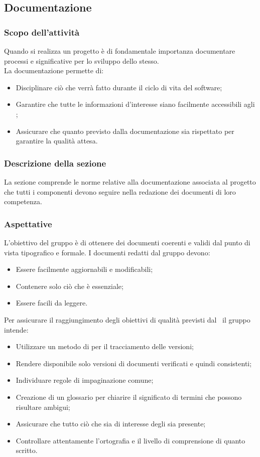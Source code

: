 \subsection{Documentazione}
\subsubsection{Scopo dell'attività} \label{PSup_Documentazione_Scopo}
Quando si realizza un progetto è di fondamentale importanza documentare processi e  significative per lo sviluppo dello stesso.\\
La documentazione permette di:
\begin{itemize}
	\item Disciplinare ciò che verrà fatto durante il ciclo di vita del software;
	\item Garantire che tutte le informazioni d'interesse siano facilmente accessibili agli ;
	\item Assicurare che quanto previsto dalla documentazione sia rispettato per garantire la qualità attesa.
\end{itemize}

\subsubsection{Descrizione della sezione} 
La sezione comprende le norme relative alla documentazione associata al progetto che tutti i componenti devono seguire nella redazione dei documenti di loro competenza.

\subsubsection{Aspettative}\label{AspettativeDocumentazione}L'obiettivo del gruppo è di ottenere dei documenti coerenti e validi dal punto di vista tipografico e formale.
I documenti redatti dal gruppo devono:
\begin{itemize}
	\item Essere facilmente aggiornabili e modificabili;
	\item Contenere solo ciò che è essenziale;
	\item Essere facili da leggere.
\end{itemize}
Per assicurare il raggiungimento degli obiettivi di qualità previsti dal \PdQ\ il gruppo intende:
\begin{itemize}
	\item Utilizzare un metodo di  per il tracciamento delle versioni;
	\item Rendere disponibile solo versioni di documenti verificati e quindi consistenti;
	\item Individuare regole di impaginazione comune;
	\item Creazione di un glossario per chiarire il significato di termini che possono risultare ambigui;
	\item Assicurare che tutto ciò che sia di interesse degli  sia presente;
	\item Controllare attentamente l'ortografia e il livello di comprensione di quanto scritto.
\end{itemize}

